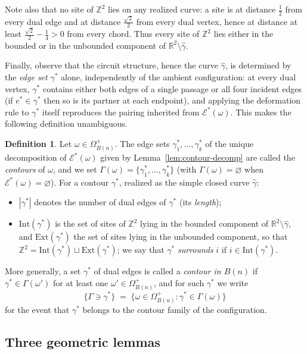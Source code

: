 \documentclass[11pt]{article}
\theoremstyle{plain}
\theoremstyle{definition}
\newtheorem{definition}[theorem]{Definition}
\theoremstyle{remark}
\newcommand{\Z}{\mathbb{Z}}
\newcommand{\R}{\mathbb{R}}
\newcommand{\Intr}{\mathrm{Int}}    %
\newcommand{\Extr}{\mathrm{Ext}}    %
\newcommand{\Gam}{\Gamma}           %
\newcommand{\dedges}{\mathscr{E}^*} %
\begin{document}
Note also that no site of $\Z^2$ lies on any realized curve: a site is at
distance $\tfrac12$ from every dual edge and at distance $\tfrac{\sqrt2}2$
from every dual vertex, hence at distance at least
$\tfrac{\sqrt2}2-\tfrac14>0$ from every chord. Thus every site of $\Z^2$
lies either in the bounded or in the unbounded component of
$\R^2\setminus\widehat\gamma$.

Finally, observe that the circuit structure, hence the curve
$\widehat\gamma$, is determined by the \emph{edge set} $\gamma^*$ alone,
independently of the ambient configuration: at every dual vertex, $\gamma^*$
contains either both edges of a single passage or all four incident edges
(if $e^*\in\gamma^*$ then so is its partner at each endpoint), and applying
the deformation rule to $\gamma^*$ itself reproduces the pairing inherited
from $\dedges(\omega)$. This makes the following definition unambiguous.

\begin{definition}\label{def:contours}
Let $\omega\in\Omega^{+}_{B(n)}$. The edge sets
$\gamma_1^*,\dots,\gamma_k^*$ of the unique decomposition of
$\dedges(\omega)$ given by Lemma~\ref{lem:contour-decomp} are called the
\emph{contours} of $\omega$, and we set
$\Gam(\omega)=\{\gamma_1^*,\dots,\gamma_k^*\}$ (with
$\Gam(\omega)=\varnothing$ when $\dedges(\omega)=\varnothing$). For a
contour $\gamma^*$, realized as the simple closed curve $\widehat\gamma$:
\begin{itemize}
  \item $|\gamma^*|$ denotes the number of dual edges of $\gamma^*$ (its
        \emph{length});
  \item $\Intr(\gamma^*)$ is the set of sites of $\Z^2$ lying in the
        bounded component of $\R^2\setminus\widehat\gamma$, and
        $\Extr(\gamma^*)$ the set of sites lying in the unbounded
        component, so that
        $\Z^2=\Intr(\gamma^*)\sqcup\Extr(\gamma^*)$; we say that $\gamma^*$
        \emph{surrounds} $i$ if $i\in\Intr(\gamma^*)$.
\end{itemize}
More generally, a set $\gamma^*$ of dual edges is called a \emph{contour in
$B(n)$} if $\gamma^*\in\Gam(\omega')$ for at least one
$\omega'\in\Omega^{+}_{B(n)}$, and for such $\gamma^*$ we write
\[
  \{\Gam\ni\gamma^*\}
  \;=\;\big\{\omega\in\Omega^{+}_{B(n)} : \gamma^*\in\Gam(\omega)\big\}
\]
for the event that $\gamma^*$ belongs to the contour family of the
configuration.
\end{definition}

\subsection{Three geometric lemmas}
\end{document}
